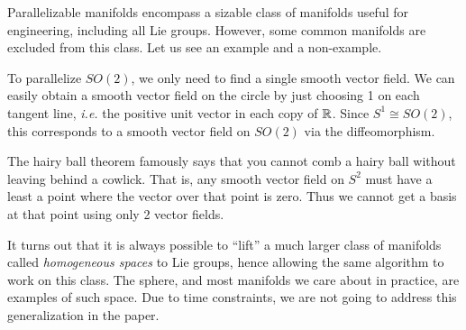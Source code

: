 \documentclass[12pt]{article}
\begin{document}
Parallelizable manifolds encompass a sizable class of manifolds useful for engineering, including all Lie groups. However, some common manifolds are excluded from this class. Let us see an example and a non-example.
\begin{eg}[$SO(2)$]
To parallelize $ SO(2)$, we only need to find a single smooth vector field. We can easily obtain a smooth vector field on the circle by just choosing 1 on each tangent line, \emph{i.e.} the positive unit vector in each copy of $ \mathbb{R}$. Since $ S^{1} \cong SO(2)$, this corresponds to a smooth vector field on $ SO(2)$ via the diffeomorphism.
\end{eg}

\begin{eg}
The hairy ball theorem famously says that you cannot comb a hairy ball without leaving behind a cowlick. That is, any smooth vector field on $S^2$ must have a least a point where the vector over that point is zero. Thus we cannot get a basis at that point using only 2 vector fields.
\end{eg}
It turns out that it is always possible to ``lift'' a much larger class of manifolds called \emph{homogeneous spaces} to Lie groups, hence allowing the same algorithm to work on this class. The sphere, and most manifolds we care about in practice, are examples of such space. Due to time constraints, we are not going to address this generalization in the paper.
\end{document}
